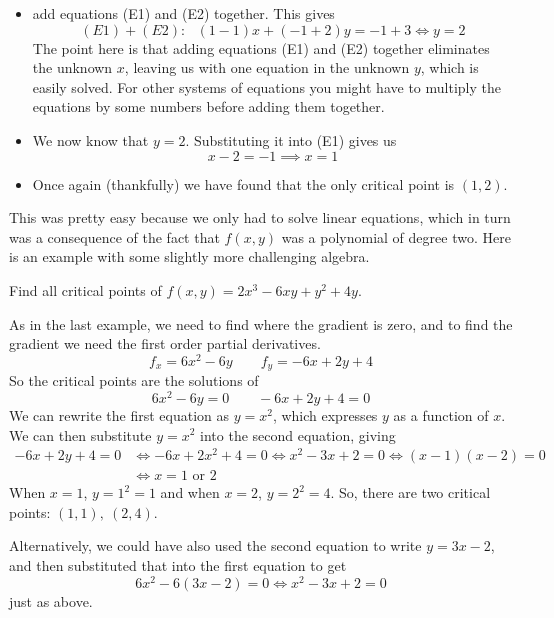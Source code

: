 \begin{eg}[$f(x,y)=x^2-2xy+2y^2+2x-6y+12$]
\begin{itemize}
\item add equations (E1) and (E2)
together. This gives 
\begin{equation*}
(E1) + (E2):\ \ \ 
 (1-1)x+(-1+2)y = -1+3
\iff y=2
\end{equation*}
The point here is that adding equations (E1) and 
(E2) together eliminates the unknown $x$, leaving us with
one equation in the unknown $y$, which is easily solved. For other
systems of equations you might have to multiply the equations by some numbers
before adding them together.

\item We now know that $y=2$. Substituting it into (E1)
gives us 
\begin{equation*}
x-2=-1
\implies x=1
\end{equation*}

\item Once again (thankfully) we have found that the only critical point is $(1,2)$.
\end{itemize}

\end{eg}
This was pretty easy because we only had to solve linear equations, which
in turn was a consequence of the fact that $f(x,y)$ was a polynomial of degree 
two. Here is an example with some slightly more challenging algebra.


\goodbreak


\begin{eg}[$f(x,y)=2x^3 - 6xy + y^2 +4y $]\label{eg:MXMNlocalB}
Find all critical points of $f(x,y)=2x^3 - 6xy + y^2 +4y $.

\soln 
As in the last example, we need to find where the gradient is zero,
and to find the gradient we need the first order partial derivatives.
\begin{equation*}
f_x=6x^2-6y   \qquad
f_y=-6x+2y+4 
\end{equation*}
So the critical points are the solutions of
\begin{equation*}
6x^2-6y=0   \qquad
-6x+2y+4 = 0
\end{equation*}
We can rewrite the first equation as $y=x^2$, which expresses $y$ as a 
function of $x$. We can then substitute $y=x^2$ into the second equation,
giving
\begin{align*}
-6x+2y+4 = 0
&\iff -6x+2x^2+4 = 0
\iff x^2-3x+2=0 
\iff (x-1)(x-2)=0 \\
&\iff x=1\text{ or }2 
\end{align*}
When $x=1$, $y=1^2=1$ and when $x=2$, $y=2^2=4$.
So, there are two critical points: $(1,1),\ (2,4)$.

Alternatively, we could have also used the second equation to write $y=3x-2$,
and then substituted that into the first equation to get
\begin{equation*}
6x^2-6(3x-2) =0
\iff x^2-3x+2=0
\end{equation*}
just as above.

\end{eg}

